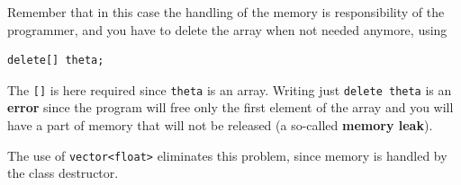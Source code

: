 \documentclass{article}
\begin{document}
Remember that in this case the handling of the memory is responsibility of the programmer, and you have to delete the array when not needed anymore, using
\begin{verbatim}
delete[] theta;
\end{verbatim}
The \texttt{[]} is here required since \texttt{theta} is an array. Writing just  \texttt{delete theta} is an \textbf{error} since the program will free only the
first element of the array and you will have a part of memory that will not be released (a so-called \textbf{memory leak}).

The use of  \texttt{vector<float>} eliminates this problem, since memory is handled by the class destructor. 
\end{document}
